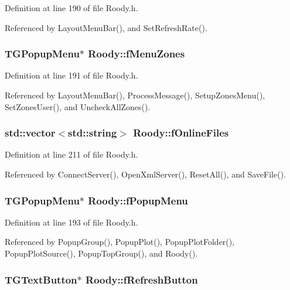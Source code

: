 Definition at line 190 of file Roody.h.

Referenced by LayoutMenuBar(), and SetRefreshRate().
\subsubsection[{fMenuZones}]{\setlength{\rightskip}{0pt plus 5cm}TGPopupMenu$\ast$ {\bf Roody::fMenuZones}\hspace{0.3cm}{\ttfamily  [private]}}\label{classRoody_a937dc50c484d341aae57f37d35d9a599}


Definition at line 191 of file Roody.h.

Referenced by LayoutMenuBar(), ProcessMessage(), SetupZonesMenu(), SetZonesUser(), and UncheckAllZones().
\subsubsection[{fOnlineFiles}]{\setlength{\rightskip}{0pt plus 5cm}std::vector$<$std::string$>$ {\bf Roody::fOnlineFiles}\hspace{0.3cm}{\ttfamily  [private]}}\label{classRoody_a5109207cb67ff1657c267cf725fbf02b}


Definition at line 211 of file Roody.h.

Referenced by ConnectServer(), OpenXmlServer(), ResetAll(), and SaveFile().
\subsubsection[{fPopupMenu}]{\setlength{\rightskip}{0pt plus 5cm}TGPopupMenu$\ast$ {\bf Roody::fPopupMenu}\hspace{0.3cm}{\ttfamily  [private]}}\label{classRoody_a53aa4ef3d5ec121e9dd2b8b18f423860}


Definition at line 193 of file Roody.h.

Referenced by PopupGroup(), PopupPlot(), PopupPlotFolder(), PopupPlotSource(), PopupTopGroup(), and Roody().
\subsubsection[{fRefreshButton}]{\setlength{\rightskip}{0pt plus 5cm}TGTextButton$\ast$ {\bf Roody::fRefreshButton}\hspace{0.3cm}{\ttfamily  [private]}}\label{classRoody_a50ba72d5913e754d763db1450a61f8fb}


